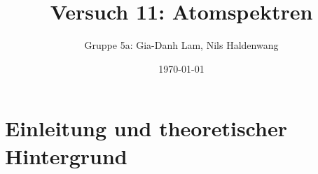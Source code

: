 \documentclass{scrartcl}
\begin{document}
\title{Versuch 11: Atomspektren}

\date{\today}

\author{Gruppe 5a: Gia-Danh Lam, Nils Haldenwang}

\maketitle
\tableofcontents

\newpage
\section{Einleitung und theoretischer Hintergrund}
\label{sec:einleitung}
\end{document}

